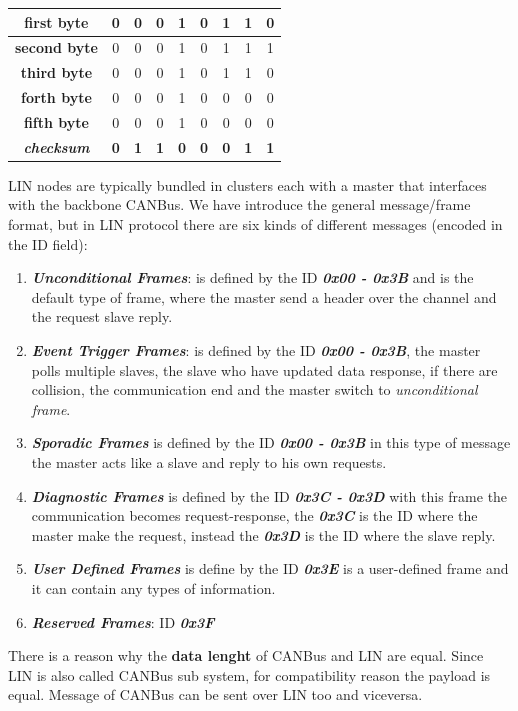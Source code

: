 \begin{enumerate}[nosep]
\begin{center}
\begin{tabular}{ | c |  c |  c |  c |  c |  c |  c |  c |  c | }
            \textbf{first byte} & 0 & 0 & 0 & 1 & 0 & 1 & 1 & 0 \\ \hline
            \textbf{second byte} & 0 & 0 & 0 & 1 & 0 & 1 & 1 & 1 \\ \hline
            \textbf{third byte} & 0 & 0 & 0 & 1 & 0 & 1 & 1 & 0 \\ \hline
            \textbf{forth byte} & 0 & 0 & 0 & 1 & 0 & 0 & 0 & 0 \\ \hline
            \textbf{fifth byte} & 0 & 0 & 0 & 1 & 0 & 0 & 0 & 0 \\ \hline
            \textbf{\textit{checksum}} & \textbf{0} & \textbf{1} & \textbf{1} & \textbf{0} & \textbf{0} & \textbf{0} & \textbf{1} & \textbf{1} \\ \hline
        \end{tabular}
    \end{center}
\end{enumerate}
LIN nodes are typically bundled in clusters each with a master that interfaces with the backbone CANBus. We have introduce the general message/frame format, but in LIN protocol there are six kinds of different messages (encoded in the ID field):
\begin{enumerate}[nosep]
    \item \textbf{\textit{Unconditional Frames}}: is defined by the ID \textbf{\textit{0x00 - 0x3B}} and is the default type of frame, where the master send a header over the channel and the request slave reply.
    \item \textbf{\textit{Event Trigger Frames}}: is defined by the ID \textbf{\textit{0x00 - 0x3B}}, the master polls multiple slaves, the slave who have updated data response, if there are collision, the communication end and the master switch to \textit{unconditional frame}.
    \item \textbf{\textit{Sporadic Frames}} is defined by the ID \textbf{\textit{0x00 - 0x3B}} in this type of message the master acts like a slave and reply to his own requests.
    \item \textbf{\textit{Diagnostic Frames}} is defined by the ID \textbf{\textit{0x3C - 0x3D}} with this frame the communication becomes request-response, the \textbf{\textit{0x3C}} is the ID where the master make the request, instead the \textbf{\textit{0x3D}} is the ID where the slave reply.
    \item \textbf{\textit{User Defined Frames}} is define by the ID \textbf{\textit{0x3E}} is a user-defined frame and it can contain any types of information.
    \item \textbf{\textit{Reserved Frames}}: ID \textbf{\textit{0x3F}}
\end{enumerate}
There is a reason why the \textbf{data lenght} of CANBus and LIN are equal. Since LIN is also called CANBus sub system, for compatibility reason the payload is equal. Message of CANBus can be sent over LIN too and viceversa.